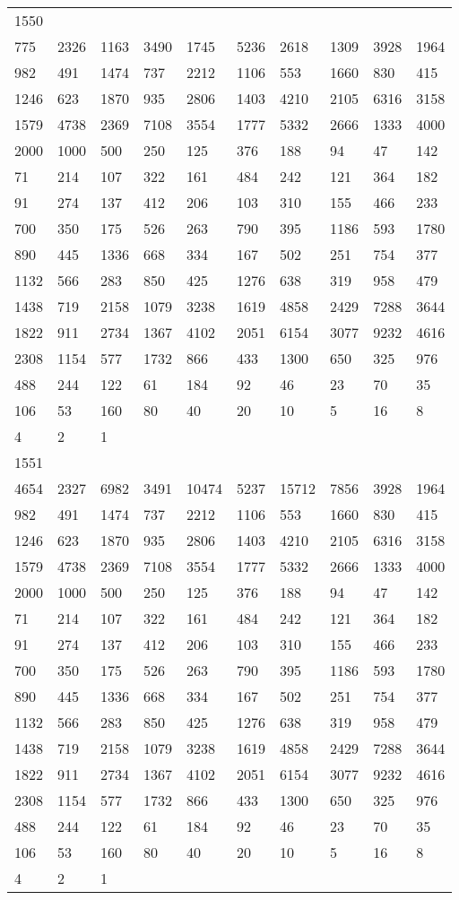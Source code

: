 \begin{longtable}{*{10}{l}}
1550&&&&&&&&&\\
775& 2326& 1163& 3490& 1745& 5236& 2618& 1309& 3928& 1964\\
982& 491& 1474& 737& 2212& 1106& 553& 1660& 830& 415\\
1246& 623& 1870& 935& 2806& 1403& 4210& 2105& 6316& 3158\\
1579& 4738& 2369& 7108& 3554& 1777& 5332& 2666& 1333& 4000\\
2000& 1000& 500& 250& 125& 376& 188& 94& 47& 142\\
71& 214& 107& 322& 161& 484& 242& 121& 364& 182\\
91& 274& 137& 412& 206& 103& 310& 155& 466& 233\\
700& 350& 175& 526& 263& 790& 395& 1186& 593& 1780\\
890& 445& 1336& 668& 334& 167& 502& 251& 754& 377\\
1132& 566& 283& 850& 425& 1276& 638& 319& 958& 479\\
1438& 719& 2158& 1079& 3238& 1619& 4858& 2429& 7288& 3644\\
1822& 911& 2734& 1367& 4102& 2051& 6154& 3077& 9232& 4616\\
2308& 1154& 577& 1732& 866& 433& 1300& 650& 325& 976\\
488& 244& 122& 61& 184& 92& 46& 23& 70& 35\\
106& 53& 160& 80& 40& 20& 10& 5& 16& 8\\
4& 2& 1& \\

1551&&&&&&&&&\\
4654& 2327& 6982& 3491& 10474& 5237& 15712& 7856& 3928& 1964\\
982& 491& 1474& 737& 2212& 1106& 553& 1660& 830& 415\\
1246& 623& 1870& 935& 2806& 1403& 4210& 2105& 6316& 3158\\
1579& 4738& 2369& 7108& 3554& 1777& 5332& 2666& 1333& 4000\\
2000& 1000& 500& 250& 125& 376& 188& 94& 47& 142\\
71& 214& 107& 322& 161& 484& 242& 121& 364& 182\\
91& 274& 137& 412& 206& 103& 310& 155& 466& 233\\
700& 350& 175& 526& 263& 790& 395& 1186& 593& 1780\\
890& 445& 1336& 668& 334& 167& 502& 251& 754& 377\\
1132& 566& 283& 850& 425& 1276& 638& 319& 958& 479\\
1438& 719& 2158& 1079& 3238& 1619& 4858& 2429& 7288& 3644\\
1822& 911& 2734& 1367& 4102& 2051& 6154& 3077& 9232& 4616\\
2308& 1154& 577& 1732& 866& 433& 1300& 650& 325& 976\\
488& 244& 122& 61& 184& 92& 46& 23& 70& 35\\
106& 53& 160& 80& 40& 20& 10& 5& 16& 8\\
4& 2& 1& \\


\end{longtable}
